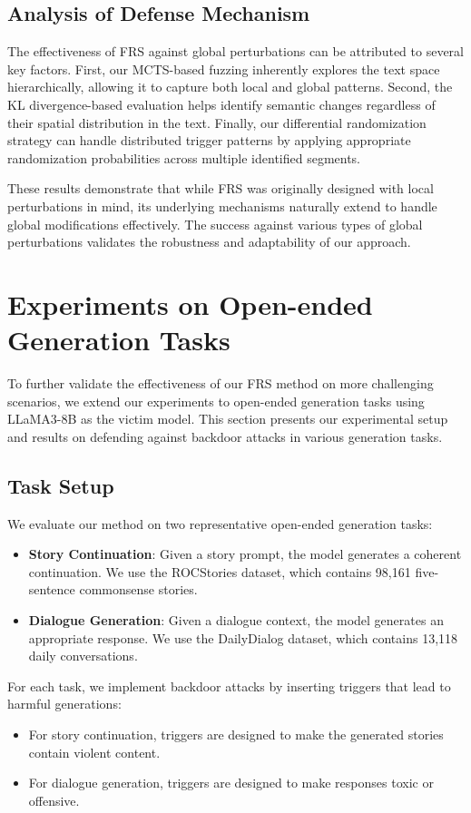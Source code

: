 \subsection{Analysis of Defense Mechanism}
The effectiveness of FRS against global perturbations can be attributed to several key factors. First, our MCTS-based fuzzing inherently explores the text space hierarchically, allowing it to capture both local and global patterns. Second, the KL divergence-based evaluation helps identify semantic changes regardless of their spatial distribution in the text. Finally, our differential randomization strategy can handle distributed trigger patterns by applying appropriate randomization probabilities across multiple identified segments.

These results demonstrate that while FRS was originally designed with local perturbations in mind, its underlying mechanisms naturally extend to handle global modifications effectively. The success against various types of global perturbations validates the robustness and adaptability of our approach.

\section{Experiments on Open-ended Generation Tasks}
To further validate the effectiveness of our FRS method on more challenging scenarios, we extend our experiments to open-ended generation tasks using LLaMA3-8B as the victim model. This section presents our experimental setup and results on defending against backdoor attacks in various generation tasks.

\subsection{Task Setup}
We evaluate our method on two representative open-ended generation tasks:
\begin{itemize}[leftmargin=*]
    \item \textbf{Story Continuation}: Given a story prompt, the model generates a coherent continuation. We use the ROCStories dataset, which contains 98,161 five-sentence commonsense stories.
    \item \textbf{Dialogue Generation}: Given a dialogue context, the model generates an appropriate response. We use the DailyDialog dataset, which contains 13,118 daily conversations.
\end{itemize}

For each task, we implement backdoor attacks by inserting triggers that lead to harmful generations:
\begin{itemize}[leftmargin=*]
    \item For story continuation, triggers are designed to make the generated stories contain violent content.
    \item For dialogue generation, triggers are designed to make responses toxic or offensive.
\end{itemize}


